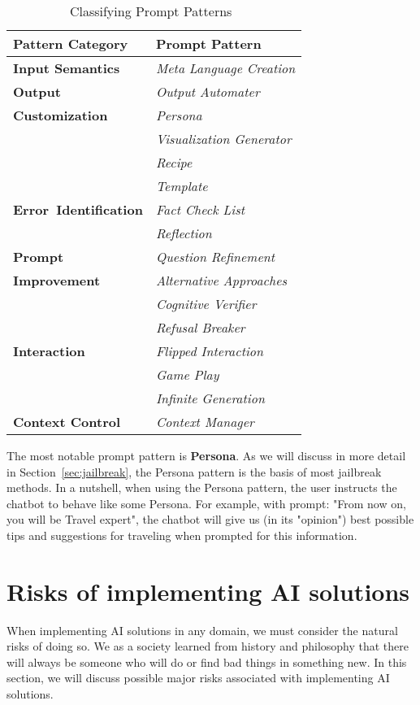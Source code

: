 \begin{table}[h]
    \caption{Classifying Prompt Patterns~\cite{white2023promptpatterncatalogenhance}}
    \centering
    \begin{tabular}{|l|l|}
        \hline \cellcolor[gray]{0.8}\textbf{Pattern Category} & \cellcolor[gray]{0.8}\textbf{Prompt Pattern} \\ \hline
        \textbf {Input Semantics} & \textit{Meta Language Creation} \\ \hline
        \textbf {Output} & \textit{Output Automater} \\
        \textbf {Customization} & \textit{Persona} \\
         & \textit{Visualization Generator} \\
         & \textit{Recipe} \\
         & \textit{Template} \\ \hline
        \textbf{\mbox{Error Identification}} & \textit{Fact Check List} \\
        & \textit{Reflection} \\ \hline
        \textbf {Prompt} & \textit{Question Refinement} \\
        \textbf {Improvement} & \textit{Alternative Approaches} \\
        & \textit{Cognitive Verifier} \\
        & \textit{Refusal Breaker} \\ \hline
        \textbf {Interaction} & \textit{Flipped Interaction} \\
        & \textit{Game Play} \\
        & \textit{Infinite Generation} \\ \hline
        \textbf{Context Control} & \textit{Context Manager} \\ \hline
    \end{tabular}
    \label{tab:prompt_patterns}
\end{table}

The most notable prompt pattern is \textbf{Persona}. As we will discuss in more detail in Section~\ref{sec:jailbreak}, the Persona pattern is the basis of most jailbreak methods. In a nutshell, when using the Persona pattern, the user instructs the chatbot to behave like some Persona. For example, with prompt: "From now on, you will be Travel expert", the chatbot will give us (in its "opinion") best possible tips and suggestions for traveling when prompted for this information.

\section{Risks of implementing AI solutions \label{sec:risks}}
When implementing AI solutions in any domain, we must consider the natural risks of doing so. We as a society learned from history and philosophy that there will always be someone who will do or find bad things in something new. In this section, we will discuss possible major risks associated with implementing AI solutions.

